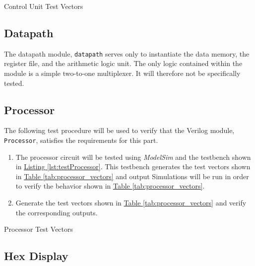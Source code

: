 \begin{table}[htbp]
    \centering
    \caption{Control Unit Test Vectors\label{tab:cunit_vectors}}
\end{table}


\subsection{Datapath} %
\label{sub:datapath_pro}

The datapath module, \verb|datapath| serves only to instantiate the data memory, the register file, and the arithmetic logic unit.
The only logic contained within the module is a simple two-to-one multiplexer.
It will therefore not be specifically tested.


\subsection{Processor} %
\label{sub:processor_pro}

The following test procedure will be used to verify that the Verilog module, \verb|Processor|, satisfies the requirements for this part.

\begin{enumerate}
    \item The processor circuit will be tested using \emph{ModelSim} and the testbench shown in \hyperref[lst:testProcessor]{Listing \ref*{lst:testProcessor}}.
    This testbench generates the test vectors shown in \hyperref[tab:processor_vectors]{Table \ref*{tab:processor_vectors}} and output %
    Simulations will be run in order to verify the behavior shown in \hyperref[tab:processor_vectors]{Table \ref*{tab:processor_vectors}}.
    \item Generate the test vectors shown in \hyperref[tab:processor_vectors]{Table \ref*{tab:processor_vectors}} and verify the corresponding outputs.
\end{enumerate}

\begin{table}[htbp]
    \centering
    \caption{Processor Test Vectors\label{tab:processor_vectors}}
\end{table}


\subsection{Hex Display} %
\label{sub:hex_display}


